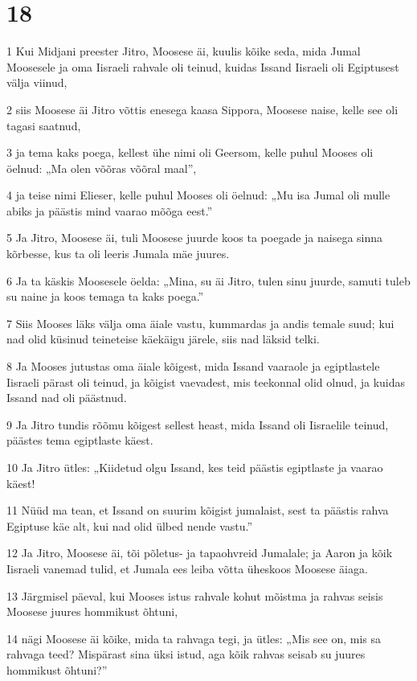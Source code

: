 \chapter{18}

\par 1 Kui Midjani preester Jitro, Moosese äi, kuulis kõike seda, mida Jumal Moosesele ja oma Iisraeli rahvale oli teinud, kuidas Issand Iisraeli oli Egiptusest välja viinud,
\par 2 siis Moosese äi Jitro võttis enesega kaasa Sippora, Moosese naise, kelle see oli tagasi saatnud,
\par 3 ja tema kaks poega, kellest ühe nimi oli Geersom, kelle puhul Mooses oli öelnud: „Ma olen võõras võõral maal”,
\par 4 ja teise nimi Elieser, kelle puhul Mooses oli öelnud: „Mu isa Jumal oli mulle abiks ja päästis mind vaarao mõõga eest.”
\par 5 Ja Jitro, Moosese äi, tuli Moosese juurde koos ta poegade ja naisega sinna kõrbesse, kus ta oli leeris Jumala mäe juures.
\par 6 Ja ta käskis Moosesele öelda: „Mina, su äi Jitro, tulen sinu juurde, samuti tuleb su naine ja koos temaga ta kaks poega.”
\par 7 Siis Mooses läks välja oma äiale vastu, kummardas ja andis temale suud; kui nad olid küsinud teineteise käekäigu järele, siis nad läksid telki.
\par 8 Ja Mooses jutustas oma äiale kõigest, mida Issand vaaraole ja egiptlastele Iisraeli pärast oli teinud, ja kõigist vaevadest, mis teekonnal olid olnud, ja kuidas Issand nad oli päästnud.
\par 9 Ja Jitro tundis rõõmu kõigest sellest heast, mida Issand oli Iisraelile teinud, päästes tema egiptlaste käest.
\par 10 Ja Jitro ütles: „Kiidetud olgu Issand, kes teid päästis egiptlaste ja vaarao käest!
\par 11 Nüüd ma tean, et Issand on suurim kõigist jumalaist, sest ta päästis rahva Egiptuse käe alt, kui nad olid ülbed nende vastu.”
\par 12 Ja Jitro, Moosese äi, tõi põletus- ja tapaohvreid Jumalale; ja Aaron ja kõik Iisraeli vanemad tulid, et Jumala ees leiba võtta üheskoos Moosese äiaga.
\par 13 Järgmisel päeval, kui Mooses istus rahvale kohut mõistma ja rahvas seisis Moosese juures hommikust õhtuni,
\par 14 nägi Moosese äi kõike, mida ta rahvaga tegi, ja ütles: „Mis see on, mis sa rahvaga teed? Mispärast sina üksi istud, aga kõik rahvas seisab su juures hommikust õhtuni?”
